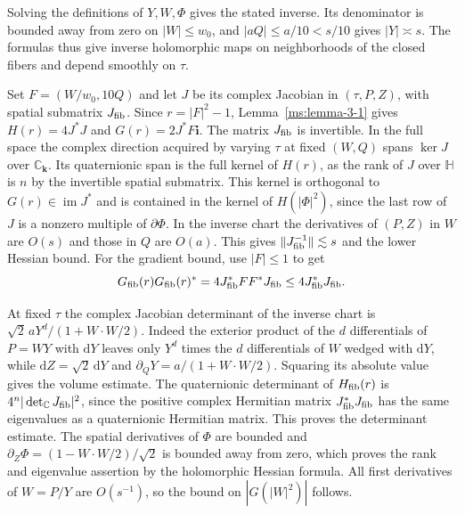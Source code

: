 Solving the definitions of $Y,W,\Phi$ gives the stated inverse. Its denominator is bounded away from zero on $|W|\le w_0$, and $|aQ|\le a/10<s/10$ gives $|Y|\asymp s$. The formulas thus give inverse holomorphic maps on neighborhoods of the closed fibers and depend smoothly on $\tau$.

Set $F=(W/w_0,10Q)$ and let $J$ be its complex Jacobian in $(\tau,P,Z)$, with spatial submatrix $J_{\rm fib}$. Since $r=|F|^2-1$, Lemma~\ref{ms:lemma-3-1} gives $H(r)=4J^*J$ and $G(r)=2J^*F\mathbf i$. The matrix $J_{\rm fib}$ is invertible. In the full space the complex direction acquired by varying $\tau$ at fixed $(W,Q)$ spans $\ker J$ over $\mathbb C_{\mathbf k}$. Its quaternionic span is the full kernel of $H(r)$, as the rank of $J$ over $\mathbb H$ is $n$ by the invertible spatial submatrix. This kernel is orthogonal to $G(r)\in\operatorname{im}J^*$ and is contained in the kernel of $H(|\Phi|^2)$, since the last row of $J$ is a nonzero multiple of $\partial\Phi$. In the inverse chart the derivatives of $(P,Z)$ in $W$ are $O(s)$ and those in $Q$ are $O(a)$. This gives $\|J_{\rm fib}^{-1}\|\lesssim s$ and the lower Hessian bound. For the gradient bound, use $|F|\le1$ to get
\[
  G_{\rm fib}(r)G_{\rm fib}(r)^*=4J_{\rm fib}^*FF^*J_{\rm fib}
     \le4J_{\rm fib}^*J_{\rm fib}.
\]

At fixed $\tau$ the complex Jacobian determinant of the inverse chart is $\sqrt 2\,aY^d/(1+W\cdot W/2)$. Indeed the exterior product of the $d$ differentials of $P=WY$ with $\mathrm dY$ leaves only $Y^d$ times the $d$ differentials of $W$ wedged with $\mathrm dY$, while $\mathrm dZ=\sqrt 2\,\mathrm dY$ and $\partial_Q Y=a/(1+W\cdot W/2)$. Squaring its absolute value gives the volume estimate. The quaternionic determinant of $H_{\rm fib}(r)$ is $4^n|\det_{\mathbb C}J_{\rm fib}|^2$, since the positive complex Hermitian matrix $J_{\rm fib}^*J_{\rm fib}$ has the same eigenvalues as a quaternionic Hermitian matrix. This proves the determinant estimate. The spatial derivatives of $\Phi$ are bounded and $\partial_Z\Phi=(1-W\cdot W/2)/\sqrt2$ is bounded away from zero, which proves the rank and eigenvalue assertion by the holomorphic Hessian formula. All first derivatives of $W=P/Y$ are $O(s^{-1})$, so the bound on $|G(|W|^2)|$ follows.
